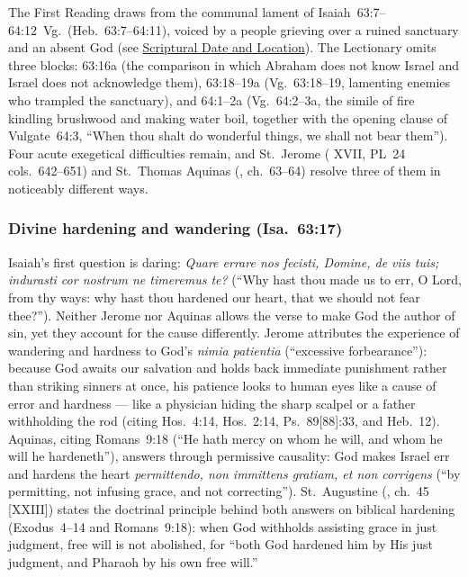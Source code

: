 The First Reading draws from the communal lament of Isaiah~63:7--64:12~Vg.\ (Heb.~63:7--64:11), voiced by a people grieving over a ruined sanctuary and an absent God (see \hyperref[sec:date-location]{Scriptural Date and Location}). The Lectionary omits three blocks: 63:16a (the comparison in which Abraham does not know Israel and Israel does not acknowledge them), 63:18--19a (Vg.~63:18--19, lamenting enemies who trampled the sanctuary), and 64:1--2a (Vg.~64:2--3a, the simile of fire kindling brushwood and making water boil, together with the opening clause of Vulgate~64:3, ``When thou shalt do wonderful things, we shall not bear them''). Four acute exegetical difficulties remain, and St.~Jerome ( XVII, PL~24 cols.~642--651) and St.~Thomas Aquinas (, ch.~63--64) resolve three of them in noticeably different ways.

\subsubsection{Divine hardening and wandering (Isa.~63:17)}
Isaiah's first question is daring: \emph{Quare errare nos fecisti, Domine, de viis tuis; indurasti cor nostrum ne timeremus te?} (``Why hast thou made us to err, O Lord, from thy ways: why hast thou hardened our heart, that we should not fear thee?''). Neither Jerome nor Aquinas allows the verse to make God the author of sin, yet they account for the cause differently. Jerome attributes the experience of wandering and hardness to God's \emph{nimia patientia} (``excessive forbearance''): because God awaits our salvation and holds back immediate punishment rather than striking sinners at once, his patience looks to human eyes like a cause of error and hardness --- like a physician hiding the sharp scalpel or a father withholding the rod (citing Hos.~4:14, Hos.~2:14, Ps.~89[88]:33, and Heb.~12). Aquinas, citing Romans~9:18 (``He hath mercy on whom he will, and whom he will he hardeneth''), answers through permissive causality: God makes Israel err and hardens the heart \emph{permittendo, non immittens gratiam, et non corrigens} (``by permitting, not infusing grace, and not correcting''). St.~Augustine (, ch.~45 [XXIII]) states the doctrinal principle behind both answers on biblical hardening (Exodus~4--14 and Romans~9:18): when God withholds assisting grace in just judgment, free will is not abolished, for ``both God hardened him by His just judgment, and Pharaoh by his own free will.''

